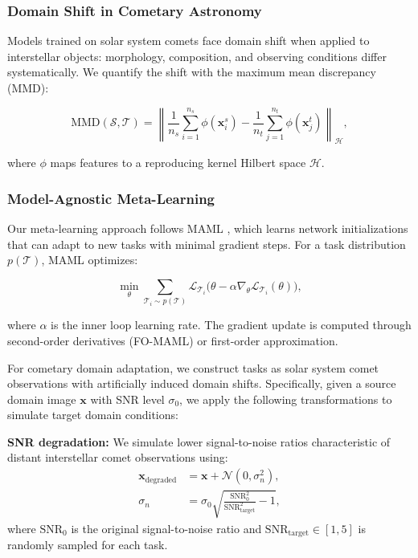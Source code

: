 \documentclass[preprint2]{aastex631}
\begin{document}
\subsubsection{Domain Shift in Cometary Astronomy}

Models trained on solar system comets face domain shift when applied to interstellar objects: morphology, composition, and observing conditions differ systematically. We quantify the shift with the maximum mean discrepancy (MMD):

\begin{equation}\label{eq:mmd}
\text{MMD}(\mathcal{S}, \mathcal{T}) = \left\| \frac{1}{n_s} \sum_{i=1}^{n_s} \phi(\mathbf{x}_i^s) - \frac{1}{n_t} \sum_{j=1}^{n_t} \phi(\mathbf{x}_j^t) \right\|_{\mathcal{H}},
\end{equation}

where $\phi$ maps features to a reproducing kernel Hilbert space $\mathcal{H}$.

\subsubsection{Model-Agnostic Meta-Learning}

Our meta-learning approach follows MAML \citep{finn17}, which learns network initializations that can adapt to new tasks with minimal gradient steps. For a task distribution $p(\mathcal{T})$, MAML optimizes:

\begin{equation}\label{eq:maml}
\min_\theta \sum_{\mathcal{T}_i \sim p(\mathcal{T})}
\mathcal{L}_{\mathcal{T}_i}\bigl(\theta - \alpha \nabla_\theta \mathcal{L}_{\mathcal{T}_i}(\theta)\bigr),
\end{equation}

where $\alpha$ is the inner loop learning rate. The gradient update is computed through second-order derivatives (FO-MAML) or first-order approximation.

For cometary domain adaptation, we construct tasks as solar system comet observations with artificially induced domain shifts. Specifically, given a source domain image $\mathbf{x}$ with SNR level $\sigma_0$, we apply the following transformations to simulate target domain conditions:

\textbf{SNR degradation:} We simulate lower signal-to-noise ratios characteristic of distant interstellar comet observations using:
\begin{equation}\label{eq:snr_degradation}
\begin{split}
\mathbf{x}_{\text{degraded}} &= \mathbf{x} + \mathcal{N}(0, \sigma_n^2), \\
\sigma_n &= \sigma_0 \sqrt{\frac{\text{SNR}_0^2}{\text{SNR}_{\text{target}}^2} - 1},
\end{split}
\end{equation}
where $\text{SNR}_0$ is the original signal-to-noise ratio and $\text{SNR}_{\text{target}} \in [1, 5]$ is randomly sampled for each task.
\end{document}
